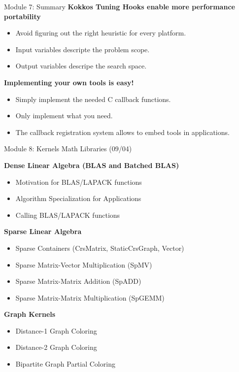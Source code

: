 \begin{frame}[fragile]{Module 7: Summary}
\textbf{Kokkos Tuning Hooks enable more performance portability}
\begin{itemize}
  \item Avoid figuring out the right heuristic for every platform.
  \item Input variables descripte the problem scope.
  \item Output variables descripe the search space.
\end{itemize}

\textbf{Implementing your own tools is easy!}
\begin{itemize}
  \item Simply implement the needed C callback functions.
  \item Only implement what you need.
  \item The callback registration system allows to embed tools in applications.
\end{itemize}

\end{frame}



\begin{frame}[fragile]{Module 8: Kernels Math Libraries (09/04)}

	\vspace{3pt}
	\textbf{Dense Linear Algebra (BLAS and Batched BLAS)}
	\begin{itemize}
        \item Motivation for BLAS/LAPACK functions
        \item Algorithm Specialization for Applications
        \item Calling BLAS/LAPACK functions
	\end{itemize}

	\vspace{3pt}
	\textbf{Sparse Linear Algebra}
	\begin{itemize}
        \item Sparse Containers (CrsMatrix, StaticCrsGraph, Vector)
        \item Sparse Matrix-Vector Multiplication (SpMV)
        \item Sparse Matrix-Matrix Addition (SpADD)
        \item Sparse Matrix-Matrix Multiplication (SpGEMM)
	\end{itemize}

  \vspace{3pt}
  \textbf{Graph Kernels}
  \begin{itemize}
        \item Distance-1 Graph Coloring
        \item Distance-2 Graph Coloring
        \item Bipartite Graph Partial Coloring
  \end{itemize}

\end{frame}

